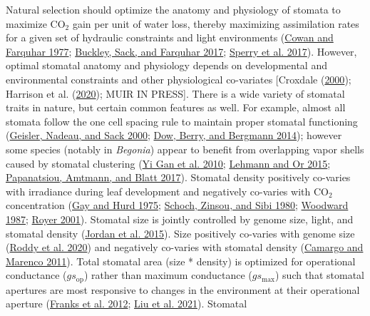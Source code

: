 \documentclass[12pt,halfline,a4paper,]{ouparticle}
\begin{document}
Natural selection should optimize the anatomy and physiology of stomata
to maximize CO\(_2\) gain per unit of water loss, thereby maximizing
assimilation rates for a given set of hydraulic constraints and light
environments (\protect\hyperlink{ref-cowan_stomatal_1977}{Cowan and
Farquhar 1977}; \protect\hyperlink{ref-buckley_optimal_2017}{Buckley,
Sack, and Farquhar 2017};
\protect\hyperlink{ref-sperry_predicting_2017}{Sperry et al. 2017}).
However, optimal stomatal anatomy and physiology depends on
developmental and environmental constraints and other physiological
co-variates {[}Croxdale
(\protect\hyperlink{ref-croxdale_stomatal_2000}{2000}); Harrison et al.
(\protect\hyperlink{ref-harrison_influence_2020}{2020}); MUIR IN
PRESS{]}. There is a wide variety of stomatal traits in nature, but
certain common features as well. For example, almost all stomata follow
the one cell spacing rule to maintain proper stomatal functioning
(\protect\hyperlink{ref-geisler_oriented_2000}{Geisler, Nadeau, and Sack
2000}; \protect\hyperlink{ref-dow_physiological_2014}{Dow, Berry, and
Bergmann 2014}); however some species (notably in \emph{Begonia}) appear
to benefit from overlapping vapor shells caused by stomatal clustering
(\protect\hyperlink{ref-yi_gan_stomatal_2010}{Yi Gan et al. 2010};
\protect\hyperlink{ref-lehmann_effects_2015}{Lehmann and Or 2015};
\protect\hyperlink{ref-papanatsiou_stomatal_2017}{Papanatsiou, Amtmann,
and Blatt 2017}). Stomatal density positively co-varies with irradiance
during leaf development and negatively co-varies with CO\(_2\)
concentration (\protect\hyperlink{ref-gay_influence_1975}{Gay and Hurd
1975}; \protect\hyperlink{ref-schoch_dependence_1980}{Schoch, Zinsou,
and Sibi 1980}; \protect\hyperlink{ref-woodward_stomatal_1987}{Woodward
1987}; \protect\hyperlink{ref-royer_stomatal_2001}{Royer 2001}).
Stomatal size is jointly controlled by genome size, light, and stomatal
density (\protect\hyperlink{ref-jordan_environmental_2015}{Jordan et al.
2015}). Size positively co-varies with genome size
(\protect\hyperlink{ref-roddy_scaling_2020}{Roddy et al. 2020}) and
negatively co-varies with stomatal density
(\protect\hyperlink{ref-camargo_density_2011}{Camargo and Marenco
2011}). Total stomatal area (size * density) is optimized for
operational conductance (\(gs_\text{op}\)) rather than maximum
conductance (\(gs_\text{max}\)) such that stomatal apertures are most
responsive to changes in the environment at their operational aperture
(\protect\hyperlink{ref-franks_physiological_2012}{Franks et al. 2012};
\protect\hyperlink{ref-liu_scaling_2021}{Liu et al. 2021}). Stomatal
\end{document}
